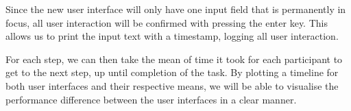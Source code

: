 Since the new user interface will only have one input field that is permanently in focus, all user interaction will be confirmed with pressing the enter key. This allows us to print the input text with a timestamp, logging all user interaction.

For each step, we can then take the mean of time it took for each participant to get to the next step, up until completion of the task. By plotting a timeline for both user interfaces and their respective means, we will be able to visualise the performance difference between the user interfaces in a clear manner.